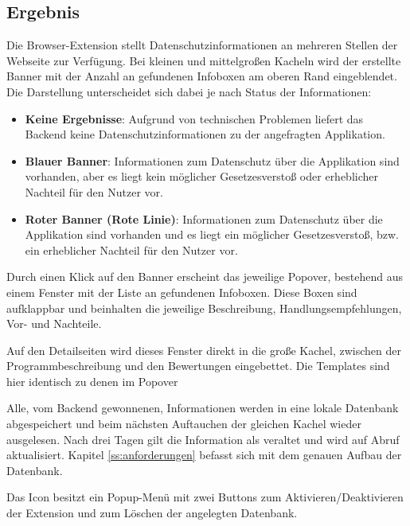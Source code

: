 \subsection{Ergebnis}
\label{ss:ergebnisseht1}

Die Browser-Extension stellt Datenschutzinformationen an mehreren Stellen der Webseite zur Verfügung. Bei kleinen und mittelgroßen Kacheln wird der erstellte Banner mit der Anzahl an gefundenen Infoboxen am oberen Rand eingeblendet. Die Darstellung unterscheidet sich dabei je nach Status der Informationen:

\begin{itemize}
	\item \textbf{\glqq Keine Ergebnisse\grqq{}}:
	Aufgrund von technischen Problemen liefert das Backend keine Datenschutzinformationen zu der angefragten Applikation.
	\item \textbf{Blauer Banner}:
	Informationen zum Datenschutz über die Applikation sind vorhanden, aber es liegt kein möglicher Gesetzesverstoß oder erheblicher Nachteil für den Nutzer vor.
	\item \textbf{Roter Banner (\glqq Rote Linie\grqq{})}:
	Informationen zum Datenschutz über die Applikation sind vorhanden und es liegt ein möglicher Gesetzesverstoß, bzw. ein erheblicher Nachteil für den Nutzer vor.
\end{itemize}


Durch einen Klick auf den Banner erscheint das jeweilige Popover, bestehend aus einem Fenster mit der Liste an gefundenen Infoboxen. Diese Boxen sind aufklappbar und beinhalten die jeweilige Beschreibung, Handlungsempfehlungen, Vor- und Nachteile.


Auf den Detailseiten wird dieses Fenster direkt in die große Kachel, zwischen der Programmbeschreibung und den Bewertungen eingebettet. Die Templates sind hier identisch zu denen im Popover


Alle, vom Backend gewonnenen, Informationen werden in eine lokale Datenbank abgespeichert und beim nächsten Auftauchen der gleichen Kachel wieder ausgelesen. Nach drei Tagen gilt die Information als veraltet und wird auf Abruf aktualisiert. Kapitel \ref{ss:anforderungen} befasst sich mit dem genauen Aufbau der Datenbank.


Das Icon besitzt ein Popup-Menü mit zwei Buttons zum Aktivieren/Deaktivieren der Extension und zum Löschen der angelegten Datenbank.

